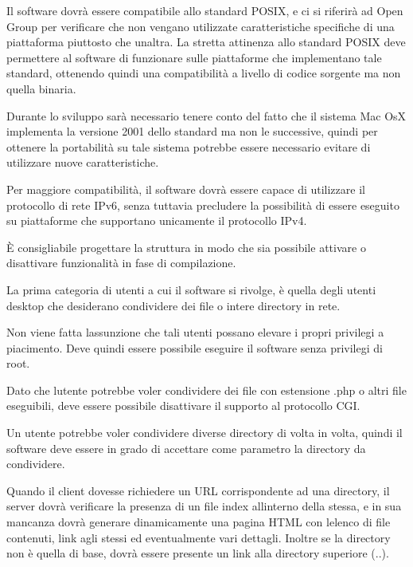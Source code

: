 \documentclass[a4paper,11pt]{article}
\begin{document}
\bigskip

{\sffamily
Il software dovr\`a essere compatibile allo standard POSIX, e ci si
riferir\`a ad {\textquotedbl}Open Group{\textquotedbl} per verificare
che non vengano utilizzate caratteristiche specifiche di una
piattaforma piuttosto che un{\textquotesingle}altra. La stretta
attinenza allo standard POSIX deve permettere al software di funzionare
sulle piattaforme che implementano tale standard, ottenendo quindi una
compatibilit\`a a livello di codice sorgente ma non quella binaria.}

{\sffamily
Durante lo sviluppo sar\`a necessario tenere conto del fatto che il
sistema Mac OsX implementa la versione 2001 dello standard ma non le
successive\cite{MAC01}, quindi per ottenere la portabilit\`a su tale sistema
potrebbe essere necessario evitare di utilizzare nuove caratteristiche.
}


\bigskip

{\sffamily
Per maggiore compatibilit\`a, il software dovr\`a essere capace di
utilizzare il protocollo di rete IPv6, senza tuttavia precludere la
possibilit\`a di essere eseguito su piattaforme che supportano
unicamente il protocollo IPv4.}


\bigskip

{\sffamily
\`E consigliabile progettare la struttura in modo che sia possibile
attivare o disattivare funzionalit\`a in fase di compilazione.}


\bigskip

{\sffamily
La prima categoria di utenti a cui il software si rivolge, \`e quella
degli utenti desktop che desiderano condividere dei file o intere
directory in rete.}

{\sffamily
Non viene fatta l{\textquotesingle}assunzione che tali utenti possano
elevare i propri privilegi a piacimento. Deve quindi essere possibile
eseguire il software senza privilegi di root.}

{\sffamily
Dato che l{\textquotesingle}utente potrebbe voler condividere dei file
con estensione .php o altri file eseguibili, deve essere possibile
disattivare il supporto al protocollo CGI.}

{\sffamily
Un utente potrebbe voler condividere diverse directory di volta in
volta, quindi il software deve essere in grado di accettare come
parametro la directory da condividere.}

{\sffamily
Quando il client dovesse richiedere un URL corrispondente ad una
directory, il server dovr\`a verificare la presenza di un file index
all{\textquotesingle}interno della stessa, e in sua mancanza dovr\`a
generare dinamicamente una pagina HTML con l{\textquotesingle}elenco di
file contenuti, link agli stessi ed eventualmente vari dettagli.
Inoltre se la directory non \`e quella di base, dovr\`a essere presente
un link alla directory superiore (..).}
\end{document}
